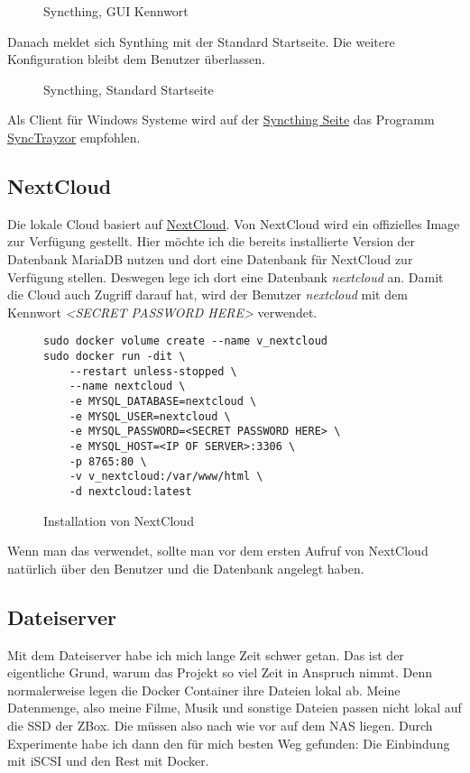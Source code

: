 \documentclass[12pt,a4paper]{article}
\newcommand{\code}[1]{\textit{#1}}
\newcommand{\jpaimg}[2]{\begin{figure}[H]\centering\fbox{\texttt{[image: \#1]}}\caption{#2}\label{fig:#2}\end{figure}}
\begin{document}
\jpaimg{./images/Syncthing-02.png}{Syncthing, GUI Kennwort}

Danach meldet sich Synthing mit der Standard Startseite. Die weitere Konfiguration bleibt dem Benutzer überlassen.

\jpaimg{./images/Syncthing-03.png}{Syncthing, Standard Startseite}

Als Client für Windows Systeme wird auf der \href{https://syncthing.net/}{Syncthing Seite} das Programm \href{https://github.com/canton7/SyncTrayzor}{SyncTrayzor}
empfohlen.

\subsection{NextCloud}
Die lokale Cloud basiert auf \href{https://nextcloud.com/}{NextCloud}. Von NextCloud wird ein offizielles Image zur
Verfügung gestellt. Hier möchte ich die bereits installierte Version der Datenbank MariaDB nutzen und dort eine
Datenbank für NextCloud zur Verfügung stellen. Deswegen lege ich dort eine Datenbank \code{nextcloud} an. Damit die
Cloud auch Zugriff darauf hat, wird der Benutzer \code{nextcloud} mit dem Kennwort \code{<SECRET PASSWORD HERE>}
verwendet.

\begin{figure}[H]
\begin{lstlisting}
sudo docker volume create --name v_nextcloud
sudo docker run -dit \
    --restart unless-stopped \
    --name nextcloud \
    -e MYSQL_DATABASE=nextcloud \
    -e MYSQL_USER=nextcloud \
    -e MYSQL_PASSWORD=<SECRET PASSWORD HERE> \
    -e MYSQL_HOST=<IP OF SERVER>:3306 \
    -p 8765:80 \
    -v v_nextcloud:/var/www/html \
    -d nextcloud:latest
\end{lstlisting}
\caption{Installation von NextCloud}\label{fig:Installation von NextCloud}
\end{figure}

Wenn man das \nameref{sec:AIOFile} verwendet, sollte man vor dem ersten Aufruf von NextCloud natürlich über
\nameref{sub:phpMyAdmin} den Benutzer und die Datenbank angelegt haben.

\subsection{Dateiserver}
Mit dem Dateiserver habe ich mich lange Zeit schwer getan. Das ist der eigentliche Grund, warum das Projekt so viel
Zeit in Anspruch nimmt. Denn normalerweise legen die Docker Container ihre Dateien lokal ab. Meine Datenmenge, also
meine Filme, Musik und sonstige Dateien passen nicht lokal auf die SSD der ZBox. Die müssen also nach wie vor auf dem
NAS liegen. Durch Experimente habe ich dann den für mich besten Weg gefunden: Die Einbindung mit iSCSI und den Rest
mit Docker.
\end{document}
